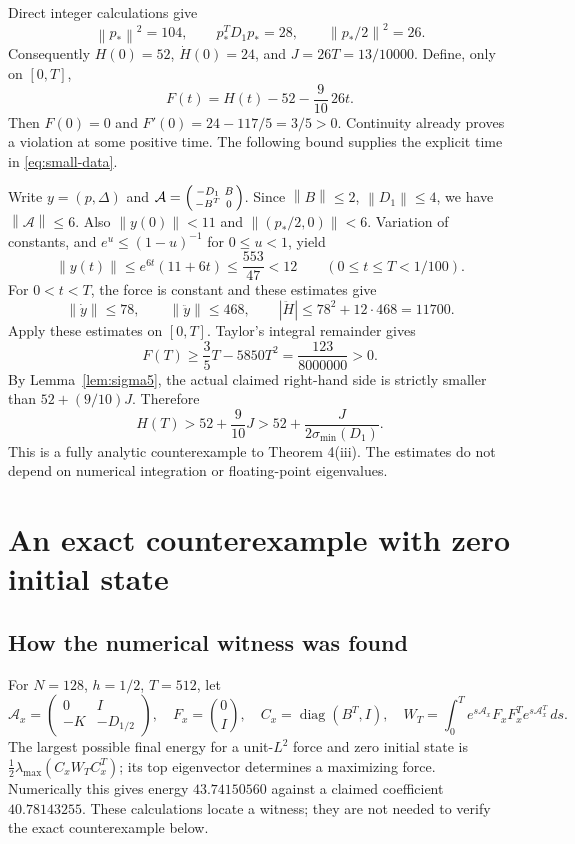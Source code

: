\documentclass[11pt,letterpaper]{article}
\newcommand{\norm}[1]{\left\lVert#1\right\rVert}
\newcommand{\sig}{\sigma_{\min}}
\begin{document}
Direct integer calculations give
\[
 \norm{p_*}^2=104,\qquad p_*^TD_1p_*=28,\qquad
 \norm{p_*/2}^2=26.
\]
Consequently $H(0)=52$, $\dot H(0)=24$, and $J=26T=13/10000$.
Define, only on $[0,T]$,
\[
 F(t)=H(t)-52-\frac9{10}\,26t.
\]
Then $F(0)=0$ and $F'(0)=24-117/5=3/5>0$.
Continuity already proves a violation at some positive time. The following
bound supplies the explicit time in \eqref{eq:small-data}.

Write $y=(p,\Delta)$ and
$\mathcal A=\begin{psmallmatrix}-D_1&B\\-B^T&0\end{psmallmatrix}$.
Since $\norm B\leq2$, $\norm{D_1}\leq4$, we have $\norm{\mathcal A}\leq6$.
Also $\norm{y(0)}<11$ and $\norm{(p_*/2,0)}<6$.
Variation of constants, and $e^u\leq(1-u)^{-1}$ for $0\leq u<1$, yield
\[
 \norm{y(t)}\leq e^{6t}(11+6t)
 \leq\frac{553}{47}<12\qquad(0\leq t\leq T<1/100).
\]
For $0<t<T$, the force is constant and these estimates give
\[
 \norm{\dot y}\leq78,\qquad \norm{\ddot y}\leq468,
 \qquad |\ddot H|\leq78^2+12\cdot468=11700.
\]
Apply these estimates on $[0,T]$. Taylor's integral remainder gives
\begin{equation}\label{eq:small-gap}
 F(T)\geq\frac35T-5850T^2
 =\frac{123}{8000000}>0.
\end{equation}
By Lemma~\ref{lem:sigma5}, the actual claimed right-hand side is strictly
smaller than $52+(9/10)J$. Therefore
\[
 H(T)>52+\frac9{10}J
 >52+\frac{J}{2\sig(D_1)}.
\]
This is a fully analytic counterexample to Theorem 4(iii). The estimates do not
depend on numerical integration or floating-point eigenvalues.

\newpage
\section{An exact counterexample with zero initial state}

\subsection*{How the numerical witness was found}
For $N=128$, $h=1/2$, $T=512$, let
\[
 \mathcal A_x=\begin{pmatrix}0&I\\-K&-D_{1/2}\end{pmatrix},\quad
 F_x=\binom0I,\quad C_x=\operatorname{diag}(B^T,I),\quad
 W_T=\int_0^T e^{s\mathcal A_x}F_xF_x^Te^{s\mathcal A_x^T}\,ds.
\]
The largest possible final energy for a unit-$L^2$ force and zero initial state
is $\tfrac12\lambda_{\max}(C_xW_TC_x^T)$; its top eigenvector determines a
maximizing force.
Numerically this gives energy $43.74150560$ against a claimed coefficient
$40.78143255$. These calculations locate a witness; they are not needed to
verify the exact counterexample below.
\end{document}
